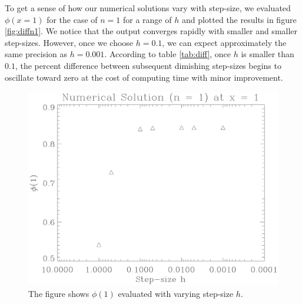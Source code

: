 \documentclass[12pt, manuscript]{article}
\begin{document}
To get a sense of how our numerical solutions vary with step-size, we evaluated $\phi(x = 1)$ for the case of $n = 1$ for a range of $h$ and plotted the results in figure \eqref{fig:diffn1}. We notice that the output converges rapidly with smaller and smaller step-sizes. However, once we choose $h = 0.1$, we can expect approximately the same precision as $h = 0.001$. According to table \eqref{tab:diff}, once $h$ is smaller than $0.1$, the percent difference between subsequent dimishing step-sizes begins to oscillate toward zero at the cost of computing time with minor improvement. 
\begin{figure}[H]
    \begin{center}
        \includegraphics[scale=0.6]{images/diffn1.eps}
        \caption{The figure shows $\phi(1)$ evaluated with varying step-size $h$.}\label{fig:diffn1}
    \end{center}
\end{figure}

\end{document}

